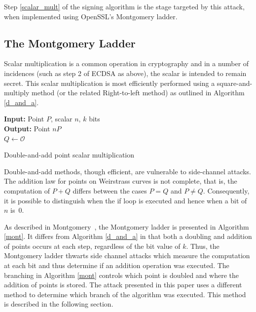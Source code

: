 \documentclass[twocolumn]{svjour3}
\begin{document}
Step \ref{scalar_mult} of the signing algorithm is the stage targeted by this attack, when implemented using OpenSSL's Montgomery ladder. %

\subsection{The Montgomery Ladder}\label{sub:montgomery}
Scalar multiplication is a common operation in cryptography and in a number of incidences (such as step 2 of ECDSA as above), the scalar is intended to remain secret. This scalar multiplication is most efficiently performed using a square-and-multiply method (or the related Right-to-left method) as outlined in Algorithm \ref{d_and_a}.\\

\vspace{-0.8cm}
\begin{algorithm}[htb]\label{d_and_a}
\SetAlgoLined
{\bf Input:} Point $P$, scalar $n$, $k$ bits\\
{\bf Output:} Point $nP$\\
$Q\gets \mathcal{O}$\\
 \caption{Double-and-add point scalar multiplication}
\end{algorithm}\vspace{-0.5cm}
Double-and-add methods, though efficient, are vulnerable to side-channel attacks. %
The addition law for points on Weirstrass curves is not complete, that is, the computation of $P+Q$ differs between the cases $P=Q$ and $P\neq Q.$ Consequently, 
it is possible to distinguish when the if loop is executed and hence when a bit of $n$ is~0.

As described in Montgomery~\cite{montgomery87speeding}, the Montgomery ladder is presented in Algorithm \ref{mont}. It differs from Algorithm \ref{d_and_a} in that both a doubling and addition of points occurs at each step, regardless of the bit value of $k$. Thus, the Montgomery ladder thwarts side channel attacks which measure the computation at each bit and thus determine if an addition operation was executed. The branching in Algorithm \ref{mont} controls which point is doubled and where the addition of points is stored. The attack presented in this paper uses a different method to determine which branch of the algorithm was executed.
This method is described in the following section.
\end{document}
